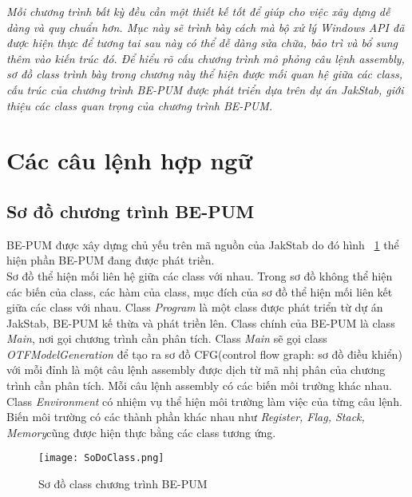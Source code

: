 
\begin{concept}[15cm]
\textit{Mỗi chương trình bất kỳ đều cần một thiết kế tốt để giúp cho việc xây dựng dễ dàng và quy chuẩn hơn. Mục này sẽ trình bày cách mà bộ xử lý Windows API đã được hiện thực để tương tai sau này có thể dễ dàng sửa chữa, bảo trì và bổ sung thêm vào kiến trúc đó. Để hiểu rõ cấu chương trình mô phỏng câu lệnh assembly, sơ đồ class trình bày trong chương này thể hiện được mối quan hệ giữa các class, cấu trúc của chương trình BE-PUM được phát triển dựa trên dự án JakStab, giới thiệu các class quan trọng của chương trình BE-PUM.}
\end{concept}

\newpage
\section{Các câu lệnh hợp ngữ}
	\subsection{Sơ đồ chương trình BE-PUM}
		BE-PUM được xây dựng chủ yếu trên mã nguồn của JakStab do đó hình ~\ref{fig:SoDoClass} thể hiện phần BE-PUM đang được phát triền. \\

		Sơ đồ thể hiện mối liên hệ giữa các class với nhau. Trong sơ đồ không thể hiện các biến của class, các hàm của class, mục đích của sơ đồ thể hiện mối liên kết giữa các class với nhau. Class \textit{Program} là một class được phát triển từ dự án JakStab, BE-PUM kế thừa và phát triền lên. Class chính của BE-PUM là class \textit{Main}, nơi gọi chương trình cần phân tích. Class \textit{Main} sẽ gọi class \textit{OTFModelGeneration} để tạo ra sơ đồ CFG(control flow graph: sơ đồ điều khiển) với mỗi đỉnh là một câu lệnh assembly được dịch từ mã nhị phân của chương trình cần phân tích. Mỗi câu lệnh assembly có các biến môi trường khác nhau. Class \textit{Environment} có nhiệm vụ thể hiện môi trường làm việc của từng câu lệnh. Biến môi trường có các thành phần khác nhau như \textit{Register, Flag, Stack, Memory}cũng được hiện thực bằng các class tương ứng.
		
		\begin{center}
			\begin{figure}[htp]
				\begin{center}
					\texttt{[image: SoDoClass.png]}
				\end{center}
				\caption{Sơ đồ class chương trình BE-PUM}	
					\label{fig:SoDoClass}		
			\end{figure}
		\end{center}					
		

